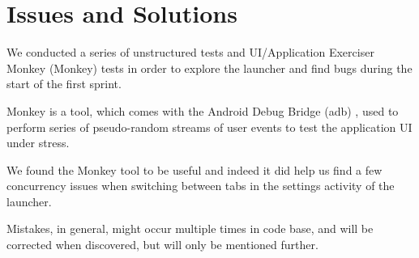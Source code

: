 
\chapter{Issues and Solutions}

We conducted a series of unstructured tests and UI/Application Exerciser Monkey (Monkey) \parencite{android_monkey} tests in order to explore the launcher and find bugs during the start of the first sprint. 

Monkey is a tool, which comes with the Android Debug Bridge (adb) \parencite{android_adb}, used to perform series of pseudo-random streams of user events to test the application UI under stress.

We found the Monkey tool to be useful and indeed it did help us find a few concurrency issues when switching between tabs in the settings activity of the launcher.

Mistakes, in general, might occur multiple times in code base, and will be corrected when discovered, but will only be  mentioned further.







